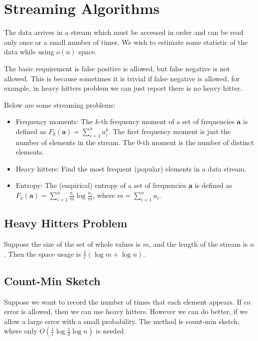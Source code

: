 \documentclass[openany]{book}
\begin{document}
\chapter{Streaming Algorithms}
The data arrives in a stream which must be accessed in order and can be read only once or a small number of times. We wish to estimate some statistic of the data while using $o(n)$ space.

The basic requirement is false positive is allowed, but false negative is not allowed. This is because sometimes it is trivial if false negative is allowed, for example, in heavy hitters problem we can just report there is no heavy hitter.

Below are some streaming problems:
\begin{itemize}
\item Frequency moments: The $k$-th frequency moment of a set of frequencies $\mathbf{a}$  is defined as $F_{k}(\mathbf{a})=\sum_{i=1}^{n}a_{i}^{k}$. The first frequency moment is just the number of elements in the stream. The $0$-th moment is the number of distinct elements.
\item Heavy hitters: Find the most frequent (popular) elements in a data stream.
\item Entropy: The (empirical) entropy of a set of frequencies $\mathbf{a}$ is defined as $F_{k}(\mathbf{a})=\sum_{i=1}^{n}\frac {a_{i}}{m}\log\frac{a_{i}}{m}$, where $m=\sum_{i=1}^{n}a_{i}$.
\end{itemize}

\section{Heavy Hitters Problem}
Suppose the size of the set of whole values is $m$, and the length of the stream is $n$. Then the space usage is $\frac{1}{\epsilon}(\log m+\log n)$.

\section{Count-Min Sketch}
Suppose we want to record the number of times that each element appears. If $\epsilon n$ error is allowed, then we can use heavy hitters. However we can do better, if we allow a large error with a small probability. The method is count-min sketch, where only $O(\frac{1}{\epsilon}\log\frac{1}{\delta}\log n)$ is needed.
\end{document}
